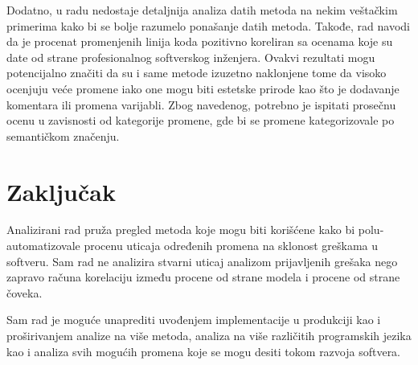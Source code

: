 \documentclass[twocolumns]{article}
\begin{document}
\begin{multicols}{2}
  Dodatno, u radu nedostaje detaljnija analiza datih metoda na nekim veštačkim primerima kako bi se bolje razumelo ponašanje datih metoda. Takođe, rad navodi da je procenat promenjenih linija koda pozitivno koreliran sa ocenama koje su date od strane profesionalnog softverskog inženjera. Ovakvi rezultati mogu potencijalno značiti da su i same metode izuzetno naklonjene tome da visoko ocenjuju veće promene iako one mogu biti estetske prirode kao što je dodavanje komentara ili promena varijabli. Zbog navedenog, potrebno je ispitati prosečnu ocenu u zavisnosti od kategorije promene, gde bi se promene kategorizovale po semantičkom značenju. 
  
  
  \section{Zaključak}
  \label{sec:conclusion}
  
  Analizirani rad pruža pregled metoda koje mogu biti korišćene kako bi polu-automatizovale procenu uticaja određenih promena na sklonost greškama u softveru. Sam rad ne analizira stvarni uticaj analizom prijavljenih grešaka nego zapravo računa korelaciju između procene od strane modela i procene od strane čoveka. 
  
  Sam rad je moguće unaprediti uvođenjem implementacije u produkciji kao i proširivanjem analize na više metoda, analiza na više različitih programskih jezika kao i analiza svih mogućih promena koje se mogu desiti tokom razvoja softvera. 
  
  
  
  
  
  
\end{multicols}
\end{document}
